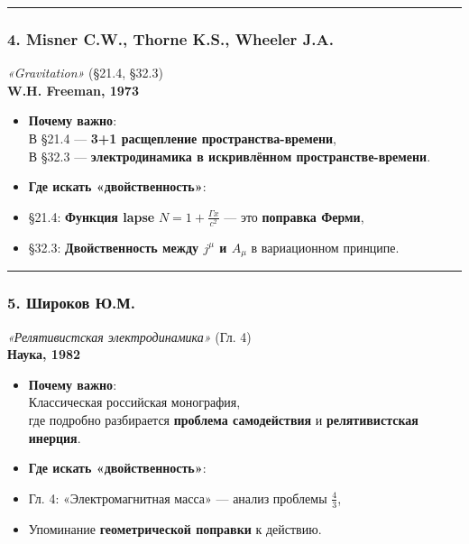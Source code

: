 \documentclass[11pt]{article}
\begin{document}
\begin{center}\rule{0.5\linewidth}{\linethickness}\end{center}

\subsubsection{\texorpdfstring{4. \textbf{Misner C.W., Thorne K.S.,
Wheeler
J.A.}}{4. Misner C.W., Thorne K.S., Wheeler J.A.}}\label{misner-c.w.-thorne-k.s.-wheeler-j.a.}

\emph{«Gravitation»} (§21.4, §32.3)\\
\textbf{W.H. Freeman, 1973}

\begin{itemize}
\item
  \textbf{Почему важно}:\\
  В §21.4 --- \textbf{3+1 расщепление пространства-времени},\\
  В §32.3 --- \textbf{электродинамика в искривлённом
  пространстве-времени}.
\item
  \textbf{Где искать «двойственность»}:\\
\item
  §21.4: \textbf{Функция lapse} \(N = 1 + \frac{\Gamma x}{c^2}\) --- это
  \textbf{поправка Ферми},\\
\item
  §32.3: \textbf{Двойственность между \(j^\mu\) и \(A_\mu\)} в
  вариационном принципе.
\end{itemize}

\begin{center}\rule{0.5\linewidth}{\linethickness}\end{center}

\subsubsection{\texorpdfstring{5. \textbf{Широков
Ю.М.}}{5. Широков Ю.М.}}\label{ux448ux438ux440ux43eux43aux43eux432-ux44e.ux43c.}

\emph{«Релятивистская электродинамика»} (Гл. 4)\\
\textbf{Наука, 1982}

\begin{itemize}
\item
  \textbf{Почему важно}:\\
  Классическая российская монография,\\
  где подробно разбирается \textbf{проблема самодействия} и
  \textbf{релятивистская инерция}.
\item
  \textbf{Где искать «двойственность»}:\\
\item
  Гл. 4: «Электромагнитная масса» --- анализ проблемы \(\frac{4}{3}\),\\
\item
  Упоминание \textbf{геометрической поправки} к действию.
\end{itemize}
\end{document}

